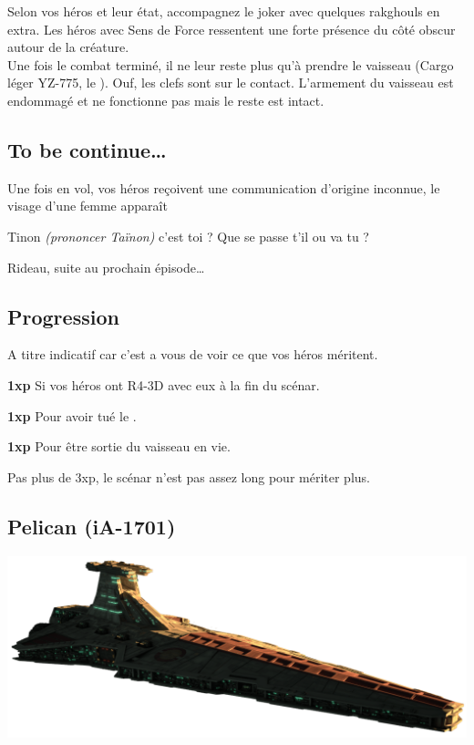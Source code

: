 Selon vos héros et leur état, accompagnez le joker avec quelques rakghouls en extra. Les héros avec Sens de Force ressentent une forte présence du côté obscur autour de la créature.\\

Une fois le combat terminé, il ne leur reste plus qu’à prendre le vaisseau (Cargo léger YZ-775, le ). Ouf, les clefs sont sur le contact. L’armement du vaisseau est endommagé et ne fonctionne pas mais le reste est intact.

\subsection{To be continue\ldots}
Une fois en vol, vos héros reçoivent une communication d’origine inconnue, le visage d’une femme apparaît

\begin{quotebox}
	Tinon \emph{(prononcer Taïnon)} c’est toi ? Que se passe t’il ou va tu ?
\end{quotebox}

Rideau, suite au prochain épisode\ldots

\subsection{Progression}
A titre indicatif car c’est a vous de voir ce que vos héros méritent.

\begin{rebelist}
	\item \textbf{1xp} Si vos héros ont R4-3D avec eux à la fin du scénar.
	\item \textbf{1xp} Pour avoir tué le .
	\item \textbf{1xp} Pour être sortie du vaisseau en vie.
\end{rebelist}
Pas plus de 3xp, le scénar n’est pas assez long pour mériter plus.

\clearpage
\subsection{Pelican (iA-1701)} \label{sec:pelican}
\includegraphics[width=\textwidth]{_img/dos-au-muur/venator.png}
\vspace{-4\baselineskip}

